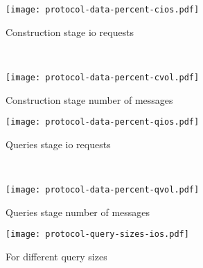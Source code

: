\newlength{\hardcodedheighto}
\newlength{\askipo}
\newlength{\bskipo}
\newlength{\blskipo}

\setlength{\hardcodedheighto}{135pt}
\setlength{\askipo}{-10pt}
\setlength{\bskipo}{0pt}
\setlength{\blskipo}{-5pt}

\begin{figure*}[ht!]
	\captionsetup{justification=centering}
	\centering
	\begin{minipage}{0.66\textwidth}
		\captionsetup[subfigure]{justification=centering}
		\centering
		\begin{subfigure}[t]{0.5\textwidth}
			\centering
			\texttt{[image: protocol-data-percent-cios.pdf]}
			\setlength{\abovecaptionskip}{\askipo}
			\setlength{\belowcaptionskip}{\bskipo}
			\caption{Construction stage \acrshort{io} requests}\label{figure:protocols-data-percent:cios}
		\end{subfigure}%
		~ %
		\begin{subfigure}[t]{0.5\textwidth}
			\centering
			\texttt{[image: protocol-data-percent-cvol.pdf]}
			\setlength{\abovecaptionskip}{\askipo}
			\setlength{\belowcaptionskip}{\bskipo}
			\caption{Construction stage number of messages}\label{figure:protocols-data-percent:cvol}
		\end{subfigure}%

		\begin{subfigure}[t]{0.5\textwidth}
			\centering
			\texttt{[image: protocol-data-percent-qios.pdf]}
			\setlength{\abovecaptionskip}{\askipo}
			\setlength{\belowcaptionskip}{\blskipo}
			\caption{Queries stage \acrshort{io} requests}\label{figure:protocols-data-percent:qios}
		\end{subfigure}%
		~ %
		\begin{subfigure}[t]{0.5\textwidth}
			\centering
			\texttt{[image: protocol-data-percent-qvol.pdf]}
			\setlength{\abovecaptionskip}{\askipo}
			\setlength{\belowcaptionskip}{\blskipo}
			\caption{Queries stage number of messages}\label{figure:protocols-data-percent:qvol}
		\end{subfigure}%
		\caption{Protocol scalability}\label{figure:protocols-data-percent}
	\end{minipage}%
	\begin{minipage}{.33\textwidth}
		\captionsetup[subfigure]{justification=centering}
		\centering
		\begin{subfigure}[t]{\textwidth}
			\centering
			\setlength{\abovecaptionskip}{-0pt}
			\setlength{\belowcaptionskip}{\bskipo}
			\texttt{[image: protocol-query-sizes-ios.pdf]}
			\caption{For different query sizes}\label{figure:protocols-query-sizes}
		\end{subfigure}%


\end{minipage}
\end{figure*}
